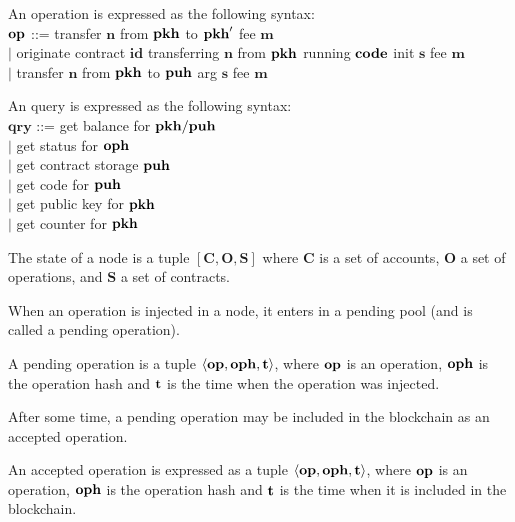 \documentclass[a4paper]{llncs}
\begin{document}
\begin{definition}[Operation]
An operation is expressed as the following syntax:
\\
$\textbf{op}$ ::= transfer  $\mathbf{n}$ from $\textbf{pkh}$ to $\textbf{pkh}'$ fee $\mathbf{m}$
\\$\mid$ originate contract $\mathbf{id}$ transferring  $\mathbf{n}$ from $\textbf{pkh}$ running $\textbf{code}$ init $\mathbf{s}$ fee $\mathbf{m}$
\\$\mid$ transfer $\mathbf{n}$ from $\textbf{pkh}$ to  $\textbf{puh}$ arg $\mathbf{s}$ fee $\mathbf{m}$
\end{definition}

\begin{definition}[Query]
An query is expressed as the following syntax:
\\
$\mathbf{qry}$ ::= get balance for $\textbf{pkh} / \textbf{puh}$
\\$\mid$ get status for $\textbf{oph}$ 
\\$\mid$ get contract storage $\textbf{puh}$ 
\\$\mid$ get code for $\textbf{puh}$ 
\\$\mid$ get public key for $\textbf{pkh}$
\\$\mid$ get counter for $\textbf{pkh}$

\end{definition}
 \begin{definition}
   The state of a node is a tuple
   $[\mathbf{C}, \mathbf{O}, \mathbf{S}]$ where $\mathbf{C}$ is a set of accounts,
   $\mathbf{O}$ a set of operations, and $\mathbf{S}$  a set of contracts. 
\end{definition}

When an operation is injected in a node, it enters in a pending pool
(and is called a pending operation). 
 \begin{definition}
A pending operation is a tuple  $\langle  \textbf{op}, \textbf{oph}, \textbf{t}
\rangle $, where $\textbf{op}$ is an operation, $\textbf{oph}$ is the operation hash
and $\textbf{t}$ is the time when the operation was injected. 
\end{definition}
After some time, a pending operation may be included in the blockchain as an accepted operation.
 \begin{definition}
An accepted operation  is expressed as a tuple $\langle  \textbf{op}, \textbf{oph}, \textbf{t} \rangle $, where $\textbf{op}$ is an operation, $\textbf{oph}$ is the operation hash and $\textbf{t}$ is the time when it is included in the blockchain. 
\end{definition}
\end{document}

